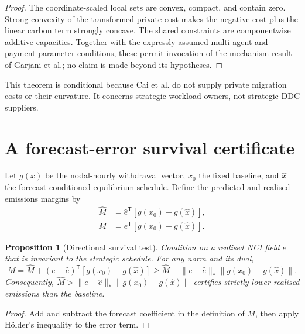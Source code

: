 \documentclass{article}
\newtheorem{proposition}{Proposition}
\begin{document}
\begin{proof}
The coordinate-scaled local sets are convex, compact, and contain zero. Strong convexity of the transformed private cost makes the negative cost plus the linear carbon term strongly concave. The shared constraints are componentwise additive capacities. Together with the expressly assumed multi-agent and payment-parameter conditions, these permit invocation of the mechanism result of Garjani et al.; no claim is made beyond its hypotheses.
\end{proof}

This theorem is conditional because Cai et al. do not supply private migration costs or their curvature. It concerns strategic workload owners, not strategic DDC suppliers.

\section{A forecast-error survival certificate}

Let $g(x)$ be the nodal-hourly withdrawal vector, $x_0$ the fixed baseline, and $\widehat x$ the forecast-conditioned equilibrium schedule. Define the predicted and realised emissions margins by
\begin{align}
 \widehat M&=\widehat e^{\mathsf T}[g(x_0)-g(\widehat x)],\\
 M&=e^{\mathsf T}[g(x_0)-g(\widehat x)].
\end{align}

\begin{proposition}[Directional survival test]
Condition on a realised NCI field $e$ that is invariant to the strategic schedule. For any norm and its dual,
\begin{equation}
 M=\widehat M+(e-\widehat e)^{\mathsf T}[g(x_0)-g(\widehat x)]
 \geq \widehat M-\lVert e-\widehat e\rVert_*
 \lVert g(x_0)-g(\widehat x)\rVert.
 \label{eq:certificate}
\end{equation}
Consequently, $\widehat M>\lVert e-\widehat e\rVert_*\lVert g(x_0)-g(\widehat x)\rVert$ certifies strictly lower realised emissions than the baseline.
\end{proposition}

\begin{proof}
Add and subtract the forecast coefficient in the definition of $M$, then apply H\"older's inequality to the error term.
\end{proof}
\end{document}

